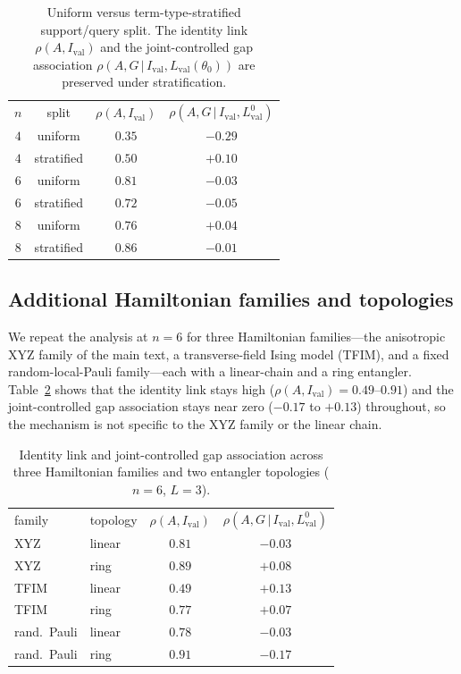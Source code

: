 \documentclass[aps,pra,onecolumn,superscriptaddress,10pt]{revtex4-2}
\newcommand{\Ival}{I_{\mathrm{val}}}
\newcommand{\thetaz}{\theta_0}
\newcommand{\Lval}{L_{\mathrm{val}}}
\begin{document}
\begin{table}[h]
\caption{\label{tab:strat}%
Uniform versus term-type-stratified support/query split. The identity link $\rho(A,\Ival)$ and the
joint-controlled gap association $\rho(A,G\,|\,\Ival,\Lval(\thetaz))$ are preserved under
stratification.}
\begin{ruledtabular}
\begin{tabular}{cccc}
$n$ & split & $\rho(A,\Ival)$ & $\rho(A,G\,|\,\Ival,\Lval^{0})$ \\
\colrule
$4$ & uniform    & $0.35$ & $-0.29$ \\
$4$ & stratified & $0.50$ & $+0.10$ \\
$6$ & uniform    & $0.81$ & $-0.03$ \\
$6$ & stratified & $0.72$ & $-0.05$ \\
$8$ & uniform    & $0.76$ & $+0.04$ \\
$8$ & stratified & $0.86$ & $-0.01$ \\
\end{tabular}
\end{ruledtabular}
\end{table}

\subsection{Additional Hamiltonian families and topologies}

We repeat the analysis at $n=6$ for three Hamiltonian families---the anisotropic XYZ family of the
main text, a transverse-field Ising model (TFIM), and a fixed random-local-Pauli family---each with a
linear-chain and a ring entangler. Table~\ref{tab:families} shows that the identity link stays high
($\rho(A,\Ival)=0.49$--$0.91$) and the joint-controlled gap association stays near zero ($-0.17$ to
$+0.13$) throughout, so the mechanism is not specific to the XYZ family or the linear chain.

\begin{table}[h]
\caption{\label{tab:families}%
Identity link and joint-controlled gap association across three Hamiltonian families and two
entangler topologies ($n=6$, $L=3$).}
\begin{ruledtabular}
\begin{tabular}{llcc}
family & topology & $\rho(A,\Ival)$ & $\rho(A,G\,|\,\Ival,\Lval^{0})$ \\
\colrule
XYZ        & linear & $0.81$ & $-0.03$ \\
XYZ        & ring   & $0.89$ & $+0.08$ \\
TFIM       & linear & $0.49$ & $+0.13$ \\
TFIM       & ring   & $0.77$ & $+0.07$ \\
rand.\ Pauli & linear & $0.78$ & $-0.03$ \\
rand.\ Pauli & ring   & $0.91$ & $-0.17$ \\
\end{tabular}
\end{ruledtabular}
\end{table}
\end{document}
